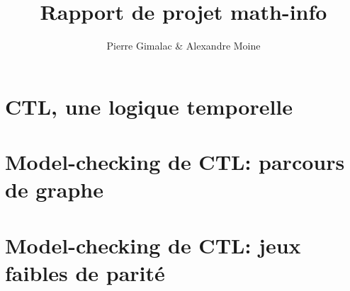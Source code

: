 \documentclass[10pt,a4paper]{article}
\author{Pierre Gimalac \& Alexandre Moine}
\title{Rapport de projet math-info}
\begin{document}
\maketitle

\section{CTL, une logique temporelle}

\section{Model-checking de CTL: parcours de graphe}

\section{Model-checking de CTL: jeux faibles de parité}
\end{document}
